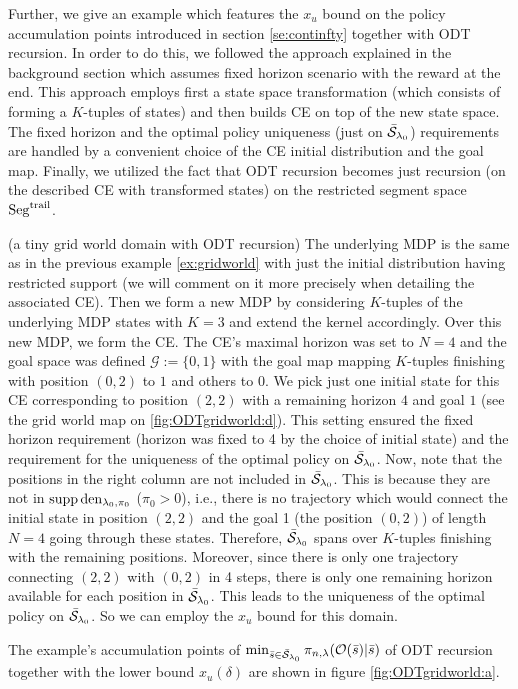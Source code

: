 Further, we give an example which features the $x_u$ bound on the \eUDRL{}
policy accumulation points introduced in section \ref{se:continfty} together
with ODT recursion. In order to do this, we followed the approach
explained in the background section which assumes fixed horizon scenario with the reward at the end. This approach employs first a state space transformation (which consists of forming a $K$-tuples of states)
and then builds CE on top of the new state space.
The fixed horizon and the optimal policy uniqueness (just on $\bar{\mathcal{S}}_{\mathit{\lambda}_0}$) requirements are handled by a convenient choice
of the CE initial distribution and the goal map. Finally, we utilized the
fact that ODT recursion becomes just \eUDRL{} recursion (on the
described CE with transformed states) on the restricted segment space $\mathrm{Seg}^{\mathrm{trail}}$.
\begin{example}\label{ex:ODTgridworld} (a tiny grid world domain with ODT recursion)
The underlying MDP is the same as in the previous example \ref{ex:gridworld}
with just the initial distribution having restricted support (we will comment on it more precisely when detailing the associated CE).
Then we form a new MDP by considering $K$-tuples of the underlying 
MDP states with $K=3$ and extend the kernel accordingly.
Over this new MDP, we form the CE. The CE's maximal horizon was set to $N=4$
and the goal space was defined $\mathcal{G} :=\{0,1\}$ with the goal map
mapping $K$-tuples finishing with position $(0,2)$ to $1$ and others
to $0$. We pick just one initial state for this CE corresponding
to position $(2,2)$ with a remaining horizon $4$ and goal $1$ (see the grid world map on \ref{fig:ODTgridworld:d}).
This setting ensured the fixed horizon requirement (horizon was fixed to 4 by the choice of initial state) and the requirement for the uniqueness of the optimal policy on $\bar{\mathcal{S}}_{\mathit{\lambda}_0}$.
Now, note that the positions in the right column are not included in $\bar{\mathcal{S}}_{\mathit{\lambda}_0}$. This is because they are not in
$\operatorname*{\mathrm{supp}} \mathrm{den}_{\mathit{\lambda}_0,\pi_0}$ ($\pi_0 >0$), i.e., there is no trajectory
which would connect the initial state in position $(2,2)$ and the goal 1
(the position $(0,2)$) of length $N=4$ going through these states.
Therefore, $\bar{\mathcal{S}}_{\mathit{\lambda}_0}$ spans over $K$-tuples finishing with
the remaining positions. Moreover, since there is only one trajectory
connecting $(2,2)$ with $(0,2)$ in 4 steps, there is only one remaining
horizon available for each position in $\bar{\mathcal{S}}_{\mathit{\lambda}_0}$.
This leads to the uniqueness of the optimal policy on $\bar{\mathcal{S}}_{\mathit{\lambda}_0}$.
So we can employ the $x_u$ bound for this domain.
\end{example}
The example's accumulation points of $\min_{\bar{s}\in \bar{\mathcal{S}}_{\mathit{\lambda}_0}} \pi_{n,\mathit{\lambda}} (\mathcal{O}(\bar{s})|\bar{s})$ of ODT recursion together with the lower bound $x_u(\delta)$ are shown in figure \ref{fig:ODTgridworld:a}.

